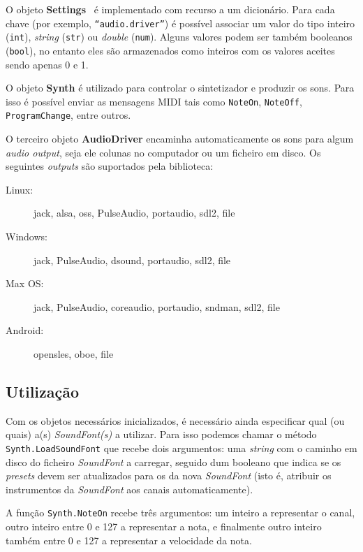 O objeto \textbf{Settings}~\cite{fluidsynth_settings} é implementado com recurso a um dicionário. Para cada chave (por exemplo, \texttt{``audio.driver''}) é possível associar um valor do tipo inteiro (\texttt{int}), \textit{string} (\texttt{str}) ou \textit{double} (\texttt{num}). Alguns valores podem ser também booleanos (\texttt{bool}), no entanto eles são armazenados como inteiros com os valores aceites sendo apenas 0 e 1.

O objeto \textbf{Synth} é utilizado para controlar o sintetizador e produzir os sons. Para isso é possível enviar as mensagens MIDI tais como \texttt{NoteOn}, \texttt{NoteOff}, \texttt{ProgramChange}, entre outros.

O terceiro objeto \textbf{AudioDriver} encaminha automaticamente os sons para algum \textit{audio output}, seja ele colunas no computador ou um ficheiro em disco. Os seguintes \textit{outputs} são suportados pela biblioteca:

\begin{adjustwidth}{20pt}{20pt}
\begin{description}
    \item[Linux:] jack, alsa, oss, PulseAudio, portaudio, sdl2, file
    \item[Windows:] jack, PulseAudio, dsound, portaudio, sdl2, file
    \item[Max OS:] jack, PulseAudio, coreaudio, portaudio, sndman, sdl2, file
    \item[Android:] opensles, oboe, file
\end{description}
\end{adjustwidth}

\subsection{Utilização}
Com os objetos necessários inicializados, é necessário ainda especificar qual (ou quais) a(s) \textit{SoundFont(s)} a utilizar. Para isso podemos chamar o método \texttt{Synth.LoadSoundFont} que recebe dois argumentos: uma \textit{string} com o caminho em disco do ficheiro \textit{SoundFont} a carregar, seguido dum booleano que indica se os \textit{presets} devem ser atualizados para os da nova \textit{SoundFont} (isto é, atribuir os instrumentos da \textit{SoundFont} aos canais automaticamente).

A função \texttt{Synth.NoteOn} recebe três argumentos: um inteiro a representar o canal, outro inteiro entre 0 e 127 a representar a nota, e finalmente outro inteiro também entre 0 e 127 a representar a velocidade da nota.

